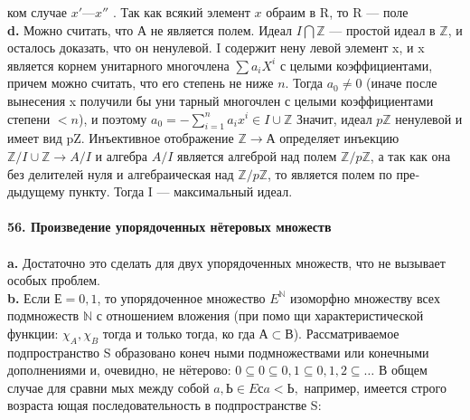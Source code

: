 ком случае $x' — x''$ . Так как всякий элемент $x$ обраим в R, то R ---\linebreak
поле\\
\hspace*{15pt}\textbf{d.}  Можно считать, что А не является полем. Идеал $I\bigcap\mathbb{Z}$ — простой\linebreak
идеал в $\mathbb{Z}$, и осталось доказать, что он ненулевой. I содержит нену­\linebreak
левой элемент x, и x является корнем унитарного многочлена $\sum a_{i}X^{i}$\linebreak
с целыми коэффициентами, причем можно считать, что его степень\linebreak
не ниже $n$. Тогда $a_0 \neq 0$ (иначе после вынесения x получили бы уни­\linebreak
тарный многочлен с целыми коэффициентами степени $< n$), и поэтому\linebreak
$a_0 = - \sum^{n}_{i = 1}a_{i}x^{i} \in I \cup \mathbb{Z}$ Значит, идеал $p\mathbb{Z}$ ненулевой и имеет вид pZ.\linebreak
Инъективное отображение $\mathbb{Z} \rightarrow А$ определяет инъекцию $\mathbb{Z}/I\cup\mathbb{Z} \rightarrow A/I$\linebreak
и алгебра $A/I$ является алгеброй над полем $\mathbb{Z}/p\mathbb{Z}$, а так как она без\linebreak
делителей нуля и алгебраическая над $\mathbb{Z}/p\mathbb{Z}$, то является полем по пре­\linebreak
дыдущему пункту. Тогда I --- максимальный идеал.\\
\\
\noindent\textbf{56. Произведение упорядоченных нётеровых множеств}\\
\\
\hspace*{15pt}\textbf{a.} Достаточно это сделать для двух упорядоченных множеств, что\linebreak
не вызывает особых проблем.\\
\hspace*{15pt}\textbf{b.} Если $Е = {0,1}$, то упорядоченное множество $E^{\mathbb{N}}$ изоморфно\linebreak
множеству всех подмножеств $\mathbb{N}$ с отношением вложения (при помо­\linebreak
щи характеристической функции: $\chi_A, \chi_B$ тогда и только тогда, ко­\linebreak
гда $А \subset В$). Рассматриваемое подпространство S образовано конеч­\linebreak
ными подмножествами или конечными дополнениями и, очевидно, не\linebreak
нётерово: $0 \subseteq {0} \subseteq {0,1} \subseteq {0,1,2} \subseteq\ldots$ В общем случае для сравни­\linebreak
мых между собой $a, Ь \in E с a < Ь,$ например, имеется строго возраста­\linebreak
ющая последовательность в подпространстве S:

